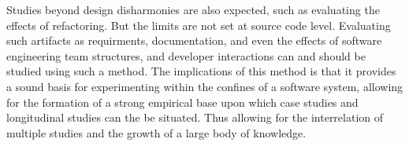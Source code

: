 Studies beyond design disharmonies are also expected, such as evaluating the
effects of refactoring. But the limits are not set at source code level.
Evaluating such artifacts as requirments, documentation, and even the effects of
software engineering team structures, and developer interactions can and should
be studied using such a method. The implications of this method is that it
provides a sound basis for experimenting within the confines of a software
system, allowing for the formation of a strong empirical base upon which case
studies and longitudinal studies can the be situated. Thus allowing for the
interrelation of multiple studies and the growth of a large body of knowledge.
